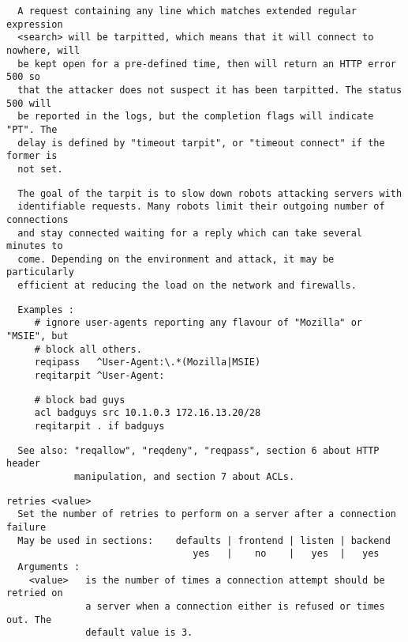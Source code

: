 \begin{verbatim}
  A request containing any line which matches extended regular expression
  <search> will be tarpitted, which means that it will connect to nowhere, will
  be kept open for a pre-defined time, then will return an HTTP error 500 so
  that the attacker does not suspect it has been tarpitted. The status 500 will
  be reported in the logs, but the completion flags will indicate "PT". The
  delay is defined by "timeout tarpit", or "timeout connect" if the former is
  not set.
\end{verbatim}

\begin{verbatim}
  The goal of the tarpit is to slow down robots attacking servers with
  identifiable requests. Many robots limit their outgoing number of connections
  and stay connected waiting for a reply which can take several minutes to
  come. Depending on the environment and attack, it may be particularly
  efficient at reducing the load on the network and firewalls.
\end{verbatim}

\begin{verbatim}
  Examples :
     # ignore user-agents reporting any flavour of "Mozilla" or "MSIE", but
     # block all others.
     reqipass   ^User-Agent:\.*(Mozilla|MSIE)
     reqitarpit ^User-Agent:
\end{verbatim}

\begin{verbatim}
     # block bad guys
     acl badguys src 10.1.0.3 172.16.13.20/28
     reqitarpit . if badguys
\end{verbatim}

\begin{verbatim}
  See also: "reqallow", "reqdeny", "reqpass", section 6 about HTTP header
            manipulation, and section 7 about ACLs.
\end{verbatim}

\begin{verbatim}
retries <value>
  Set the number of retries to perform on a server after a connection failure
  May be used in sections:    defaults | frontend | listen | backend
                                 yes   |    no    |   yes  |   yes
  Arguments :
    <value>   is the number of times a connection attempt should be retried on
              a server when a connection either is refused or times out. The
              default value is 3.
\end{verbatim}

